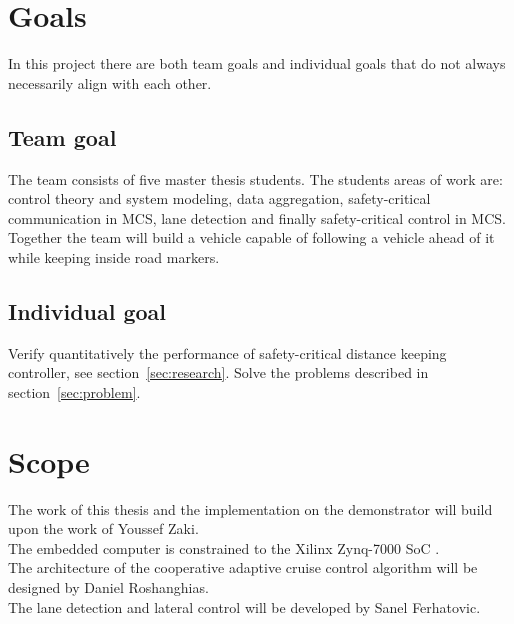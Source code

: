 \section{Goals}
In this project there are both team goals and individual goals that do not always necessarily align with each other.

\subsection{Team goal}
The team consists of five master thesis students. The students areas of work are: control theory and system modeling, data aggregation, safety-critical communication in MCS, lane detection and finally safety-critical control in MCS. Together the team will build a vehicle capable of following a vehicle ahead of it while keeping inside road markers.

\subsection{Individual goal}
Verify quantitatively the performance of safety-critical distance keeping controller, see section~\ref{sec:research}. Solve the problems described in section~\ref{sec:problem}.

\section{Scope}
\label{sec:scope}
The work of this thesis and the implementation on the demonstrator will build upon the work of Youssef Zaki\cite{zaki2016}.\\

The embedded computer is constrained to the Xilinx Zynq-7000 SoC \cite{website:xilinx}.\\

The architecture of the cooperative adaptive cruise control algorithm will be designed by Daniel Roshanghias.\\

The lane detection and lateral control will be developed by Sanel Ferhatovic.


